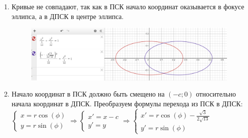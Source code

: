 \begin{enumerate}
    \item Кривые не совпадают, так как в ПСК начало координат оказывается в фокусе эллипса, а в ДПСК в центре эллипса.
    \begin{figure}[H]
        \centering
        \includegraphics[width=1\linewidth]{images/2_c_1}
    \end{figure}

    \item Начало координат в ПСК должно быть смещено на $(-c; 0)$ относительно начала координат в ДПСК. Преобразуем формулы перехода из ПСК в ДПСК: $\begin{cases}
                                                                                                                                                         x = r\cos(\phi)\\ y = r\sin(\phi)
    \end{cases} \Rightarrow
    \begin{cases}
        x' =  x - c \\ y' = y
    \end{cases} \Rightarrow
    \begin{cases}
        x' = r\cos(\phi) - \frac{\sqrt{3}}{2\sqrt{13}}\\ y'  = r\sin(\phi)
    \end{cases}$

\end{enumerate}

\clearpage